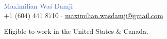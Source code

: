 \documentclass[11pt]{article}
\newcommand{\headinginline}[2]{
    \begin{minipage}[t]{0.55\textwidth}
    \vspace*{\fill}
    #1
    \end{minipage}
    \begin{minipage}[t]{0.45\textwidth}
    \begin{flushright}
    \vspace*{\fill}
    \vspace{8px}
    #2
    \end{flushright}
    \end{minipage}
}
\newcommand{\github}[1]{\href{https://github.com/#1/}{github.com/#1}}
\newcommand{\email}[1]{\href{mailto:#1}{#1}}
\newcommand{\linkedin}[1]{\href{https://www.linkedin.com/in/#1/}{#1}}
\begin{document}

\begin{flushright}
\end{flushright}

\begin{center}
    {
        \Huge
        \textcolor{RoyalBlue}{Maximilian Waś Damji} \\
    }
    \faPhone{}
    +1 (604) 441 8710 $\cdot$
    \faEnvelope{}
    \email{maximilian.wasdamji@gmail.com}
\end{center}

\begin{center}
Eligible to work in the United States \& Canada.
\end{center}






\end{document}
